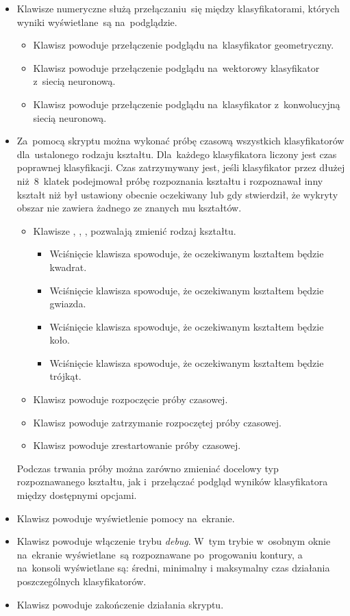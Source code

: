 \documentclass[11pt,a4paper]{article}
\begin{document}
\begin{itemize}
    \item Klawisze numeryczne służą przełączaniu~się między klasyfikatorami, których wyniki wyświetlane~są na~podglądzie.
    \begin{itemize}
        \item Klawisz  powoduje przełączenie podglądu na~klasyfikator geometryczny.
        \item Klawisz  powoduje przełączenie podglądu na~wektorowy klasyfikator z~siecią neuronową.
        \item Klawisz  powoduje przełączenie podglądu na~klasyfikator z~konwolucyjną siecią neuronową.
    \end{itemize}
    \item Za~pomocą skryptu można wykonać próbę czasową wszystkich klasyfikatorów dla~ustalonego rodzaju kształtu.
    Dla~każdego klasyfikatora liczony jest czas poprawnej klasyfikacji.
    Czas zatrzymywany jest, jeśli klasyfikator przez dłużej niż~8~klatek podejmował próbę rozpoznania kształtu i rozpoznawał inny kształt niż był ustawiony obecnie oczekiwany lub gdy stwierdził, że wykryty obszar nie zawiera żadnego ze znanych mu kształtów.
    \begin{itemize}
        \item Klawisze , , ,  pozwalają zmienić rodzaj kształtu.
        \begin{itemize}
            \item Wciśnięcie klawisza  spowoduje, że oczekiwanym kształtem będzie kwadrat.
            \item Wciśnięcie klawisza  spowoduje, że oczekiwanym kształtem będzie gwiazda.
            \item Wciśnięcie klawisza  spowoduje, że oczekiwanym kształtem będzie koło.
            \item Wciśnięcie klawisza  spowoduje, że oczekiwanym kształtem będzie trójkąt.
        \end{itemize}
        \item Klawisz  powoduje rozpoczęcie próby czasowej.
        \item Klawisz  powoduje zatrzymanie rozpoczętej próby czasowej.
        \item Klawisz  powoduje zrestartowanie próby czasowej.
    \end{itemize}
    Podczas trwania próby można zarówno zmieniać docelowy typ rozpoznawanego kształtu, jak i~przełączać podgląd wyników klasyfikatora między dostępnymi opcjami.
    \item Klawisz  powoduje wyświetlenie pomocy na~ekranie.
    \item Klawisz  powoduje włączenie trybu \emph{debug}.
    W~tym trybie w~osobnym oknie na~ekranie wyświetlane~są rozpoznawane po~progowaniu kontury, a na~konsoli wyświetlane są: średni, minimalny i maksymalny czas działania poszczególnych klasyfikatorów.
    \item Klawisz  powoduje zakończenie działania skryptu.
\end{itemize}
\end{document}
